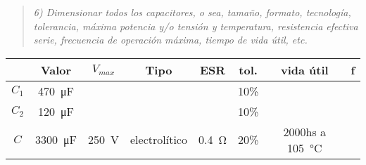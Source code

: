 \begin{quote} \textit{6) Dimensionar todos los capacitores, o sea, tamaño, formato, tecnología, tolerancia, máxima potencia y/o tensión y temperatura, resistencia efectiva serie, frecuencia de operación máxima, tiempo de vida útil, etc.}
\end{quote}

\begin{table}[H]
	\centering
	\begin{tabular}{cccccccc}
		\toprule
		& Valor & $V_{max}$ & Tipo & ESR & tol. & vida útil &f \\
		\midrule
		$C_1$ & \SI{470}{\micro\farad} & & &  & 10\% & &  \\
		$C_2$ &\SI{120}{\micro\farad} & & & & 10\% & &\\
		$C$ &\SI{3300}{\micro\farad} & \SI{250}{\volt} & electrolítico & \SI{0.4}{\ohm} & 20\% &  2000hs a \SI{105}{\celsius} & \\
		\bottomrule
	\end{tabular}
\end{table}
